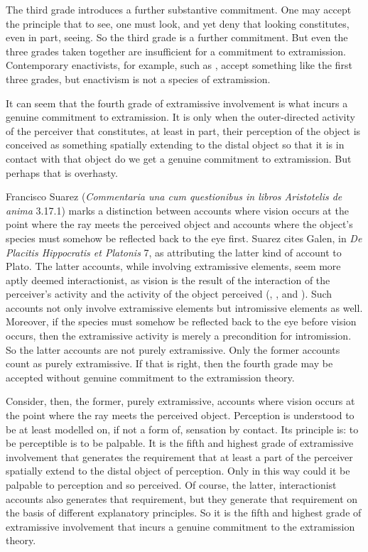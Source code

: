 \documentclass[12pt]{article}
\begin{document}
The third grade introduces a further substantive commitment. One may accept the principle that to see, one must look, and yet deny that looking constitutes, even in part, seeing. So the third grade is a further commitment. But even the three grades taken together are insufficient for a commitment to extramission. Contemporary enactivists, for example, such as \citet{Noe:2004fk}, accept something like the first three grades, but enactivism is not a species of extramission.

It can seem that the fourth grade of extramissive involvement is what incurs a genuine commitment to extramission. It is only when the outer-directed activity of the perceiver that constitutes, at least in part, their perception of the object is conceived as something spatially extending to the distal object so that it is in contact with that object do we get a genuine commitment to extramission. But perhaps that is overhasty. 

Francisco Suarez (\emph{Commentaria una cum questionibus in libros Aristotelis de anima} 3.17.1) marks a distinction between accounts where vision occurs at the point where the ray meets the perceived object and accounts where the object's species must somehow be reflected back to the eye first. Suarez cites Galen, in \emph{De Placitis Hippocratis et Platonis} 7, as attributing the latter kind of account to Plato. The latter accounts, while involving extramissive elements, seem more aptly deemed interactionist, as vision is the result of the interaction of the perceiver's activity and the activity of the object perceived (\citealt[22--23]{Smith:1996sh}, \citealt{Remes:2014en}, and \citealt{Squire:2016aa}). Such accounts not only involve extramissive elements but intromissive elements as well. Moreover, if the species must somehow be reflected back to the eye before vision occurs, then the extramissive activity is merely a precondition for intromission. So the latter accounts are not purely extramissive. Only the former accounts count as purely extramissive. If that is right, then the fourth grade may be accepted without genuine commitment to the extramission theory.

Consider, then, the former, purely extramissive, accounts where vision occurs at the point where the ray meets the perceived object. Perception is understood to be at least modelled on, if not a form of, sensation by contact. Its principle is: to be perceptible is to be palpable. It is the fifth and highest grade of extramissive involvement that generates the requirement that at least a part of the perceiver spatially extend to the distal object of perception. Only in this way could it be palpable to perception and so perceived. Of course, the latter, interactionist accounts also generates that requirement, but they generate that requirement on the basis of different explanatory principles. So it is the fifth and highest grade of extramissive involvement that incurs a genuine commitment to the extramission theory. 
\end{document}
